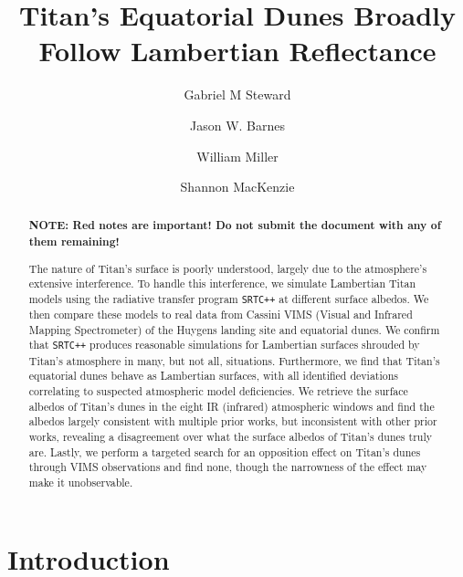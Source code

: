 \documentclass[twocolumn,linenumbers]{aastex631}
\def\srtcppspace{{\tt SRTC++} }
\begin{document}
\title{Titan's Equatorial Dunes Broadly Follow Lambertian Reflectance}

\author[0000-0002-8482-4669]{Gabriel M Steward}


\author{Jason W. Barnes}


\author{William Miller}


\author{Shannon MacKenzie}


\begin{abstract}

\textbf{\color{red}NOTE: Red notes are important! Do not submit the document with any of them remaining!\color{black}}

The nature of Titan's surface is poorly understood, largely due to the atmosphere's extensive interference. To handle this interference, we simulate Lambertian Titan models using the radiative transfer program \srtcppspace at different surface albedos. We then compare these models to real data from Cassini VIMS (Visual and Infrared Mapping Spectrometer) of the Huygens landing site and equatorial dunes. We confirm that \srtcppspace produces reasonable simulations for Lambertian surfaces shrouded by Titan's atmosphere in many, but not all, situations. Furthermore, we find that Titan's equatorial dunes behave as Lambertian surfaces, with all identified deviations correlating to suspected atmospheric model deficiencies. We retrieve the surface albedos of Titan's dunes in the eight IR (infrared) atmospheric windows and find the albedos largely consistent with multiple prior works, but inconsistent with other prior works, revealing a disagreement over what the surface albedos of Titan's dunes truly are. Lastly, we perform a targeted search for an opposition effect on Titan's dunes through VIMS observations and find none, though the narrowness of the effect may make it unobservable.

\end{abstract}


\section{Introduction} \label{sec:intro}
\end{document}
